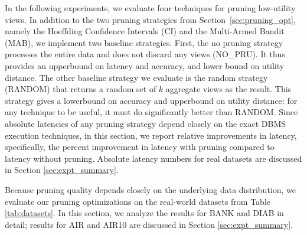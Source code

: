 In the following experiments, we evaluate four techniques for pruning low-utility views.
In addition to the two pruning strategies from Section~\ref{sec:pruning_opt}, 
namely the Hoeffding Confidence Intervals (CI) and the Multi-Armed Bandit (MAB),
we implement two baseline strategies.
First, the no pruning strategy processes the entire data and does not discard any views (NO\_PRU). 
It thus provides an upperbound on latency and accuracy, and lower bound on utility distance.
The other baseline strategy we evaluate is the random strategy (RANDOM) that returns a random 
set of $k$ aggregate views as the result.
This strategy gives a lowerbound on accuracy and upperbound on utility distance: for any 
technique to be useful, it must do significantly better than RANDOM.
Since absolute latencies of any pruning strategy depend closely on the exact DBMS execution techniques, 
in this section, we report relative improvements in latency, specifically, the percent improvement 
in latency with pruning compared to latency without pruning.
Absolute latency numbers for real datasets are discussed in Section \ref{sec:expt_summary}.


Because pruning quality depends closely on the underlying data distribution, we evaluate
our pruning optimizations on the real-world datasets from Table \ref{tab:datasets}. 
In this section, we analyze the results for BANK and DIAB in detail; results for AIR and AIR10 are 
discussed in Section \ref{sec:expt_summary}. 







